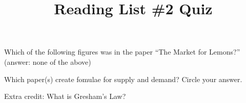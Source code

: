 \documentclass[options]{exam}
\title{Reading List \#2 Quiz}
\begin{document}
\maketitle
\vspace{5mm}




\begin{questions}

    \question Which of the following figures was in the paper ``The Market for Lemons?'' (answer: none of the above)
    
    \question Which paper(s) create fomulae for supply and demand? Circle your answer.
    
    \question Extra credit: What is Gresham's Law?
    
    \end{questions}
    \clearpage
\end{document}
